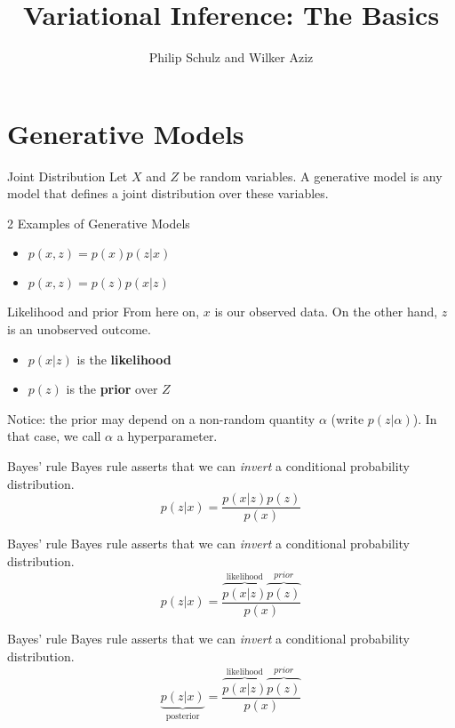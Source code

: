 \documentclass[14pt]{beamer}
\title{Variational Inference: The Basics}
\date{}
\author[Schulz and Aziz]{Philip Schulz and Wilker Aziz}
\begin{document}
\frame{\titlepage}

\section{Generative Models}

\begin{frame}{Joint Distribution}
Let $ X $ and $ Z $ be random variables. A generative model is any model that defines a joint distribution
over these variables. 
\pause
\begin{block}{2 Examples of Generative Models}
\begin{itemize}
\item $ p(x,z) = p(x) p(z|x) $
\item $ p(x,z) = p(z) p(x|z) $
\end{itemize}
\end{block}
\end{frame}

\begin{frame}{Likelihood and prior}
From here on, $ x $ is our observed data. On the other hand, $ z $ is an unobserved outcome. 
\begin{itemize}
\item $ p(x|z) $ is the \textbf{likelihood}
\item $ p(z) $ is the \textbf{prior} over $ Z $
\end{itemize} 
Notice: the prior may depend on a non-random quantity $ \alpha $ (write $ p(z|\alpha) $). In that case, we 
call $ \alpha $ a hyperparameter.
\end{frame}

\begin{frame}{Bayes' rule}
Bayes rule asserts that we can \textit{invert} a conditional probability distribution.
\begin{equation}
p(z|x) = \frac{p(x|z)p(z)}{p(x)}
\end{equation}
\end{frame}

\begin{frame}{Bayes' rule}
Bayes rule asserts that we can \textit{invert} a conditional probability distribution.
\begin{equation}
p(z|x) = \frac{\overbrace{p(x|z)}^{\text{likelihood}}\overbrace{p(z)}^{prior}}{p(x)}
\end{equation}
\end{frame}

\begin{frame}{Bayes' rule}
Bayes rule asserts that we can \textit{invert} a conditional probability distribution.
\begin{equation}
\underbrace{p(z|x)}_{\text{posterior}} = \frac{\overbrace{p(x|z)}^{\text{likelihood}}\overbrace{p(z)}^{prior}}{p(x)}
\end{equation}
\end{frame}
\end{document}
